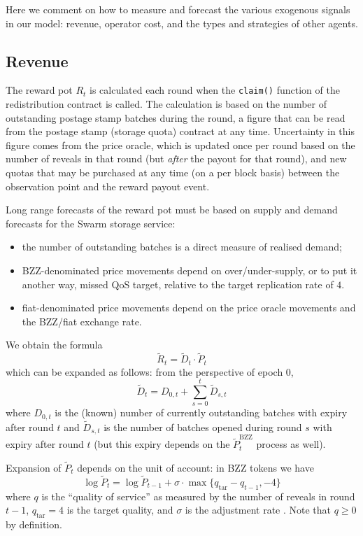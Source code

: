 \begin{notes}

  \item Here we comment on how to measure and forecast the various exogenous signals in our model: revenue, operator cost, and the types and strategies of other agents.

\end{notes}


\subsection{Revenue}
\label{section:revenue}

The reward pot $R_t$ is calculated each round when the \texttt{claim()} function of the redistribution contract is called.
%
The calculation is based on the number of outstanding postage stamp batches during the round, a figure that can be read from the postage stamp (storage quota) contract at any time.
%
Uncertainty in this figure comes from the price oracle, which is updated once per round based on the number of reveals in that round (but \emph{after} the payout for that round), and new quotas that may be purchased at any time (on a per block basis) between the observation point and the reward payout event.

Long range forecasts of the reward pot must be based on supply and demand forecasts for the Swarm storage service:
\begin{itemize}
  \item 
    the number of outstanding batches is a direct measure of realised demand;
  \item
    BZZ-denominated price movements depend on over/under-supply, or to put it another way, missed QoS target, relative to the target replication rate of $4$.
  \item
    fiat-denominated price movements depend on the price oracle movements and the BZZ/fiat exchange rate.
\end{itemize}
%
We obtain the formula
\[
  \tilde{R}_t = \tilde{D}_t \cdot \tilde{P}_t 
\]
which can be expanded as follows: from the perspective of epoch $0$,
\[
  \tilde{D}_t = D_{0,t} + \sum_{s=0}^{t} \tilde{D}_{s,t}
\]
where $D_{0,t}$ is the (known) number of currently outstanding batches with expiry after round $t$ and $\tilde{D}_{s,t}$ is the number of batches opened during round $s$ with expiry after round $t$ (but this expiry depends on the $\tilde{P}_t^\mathrm{BZZ}$ process as well).

Expansion of $\tilde{P}_t$ depends on the unit of account: in BZZ tokens we have 
\[
  \log\tilde{P}_t = \log\tilde{P}_{t-1} + \sigma\cdot \max\{q_\mathrm{tar} - q_{t-1},-4\}
\]
where $q$ is the ``quality of service'' as measured by the number of reveals in round $t-1$, $q_\mathrm{tar}=4$ is the target quality, and $\sigma$ is the adjustment rate \cite[\S3.4.5]{book-of-swarm}.
%
Note that $q\geq 0$ by definition.



